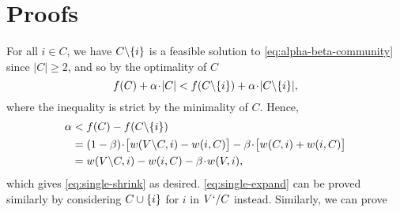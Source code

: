 \section{Proofs}
\label{sec:proofs}

\begin{Proof} 
	
	For all $i\in C$, we have $C\backslash \{i\}$ is a feasible solution to
	\eqref{eq:alpha-beta-community} since $|C| \geq 2$, and so by the optimality of $C$
	$$f(C) + \alpha \!\cdot\! |C| < f(C\backslash \{i\}) + \alpha \!\cdot\!
	|C\backslash \{i\}|,$$
	where the inequality is strict by the minimality of $C$. 
	Hence,
	\begin{align*}
	\alpha &< f(C) - f(C\backslash \{i\}) 
	\\ &
	= (1-\beta)\!\cdot\! \big[w(V\backslash C,i) - w(i,C) \big] - \beta\!\cdot\! \big[w(C,i) + w(i,C) \big]
	\\ &
	= w(V\backslash C,i) - w(i,C)  - \beta\!\cdot\! w(V,i),
	\end{align*}
	which gives \eqref{eq:single-shrink} as desired. \eqref{eq:single-expand} can be proved similarly by considering $C\cup \{i\}$ for $i$ in $V`/C$ instead.
	Similarly, we can prove 
	
        

\end{Proof}
